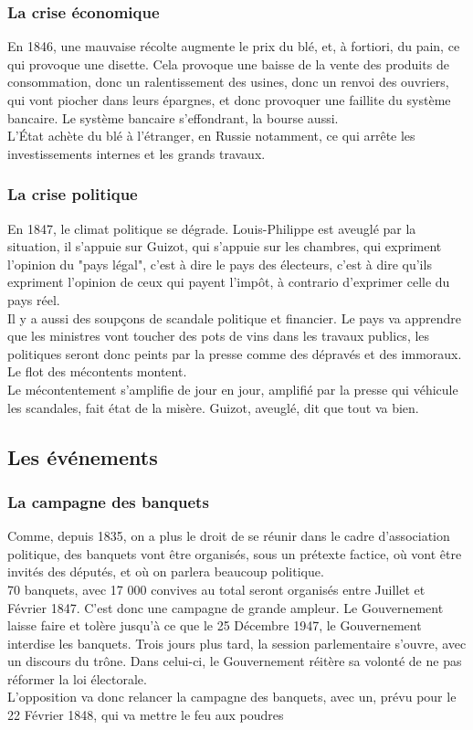 \documentclass[10pt, a4paper, openany]{book}
\begin{document}
\subsubsection{La crise économique}

En 1846, une mauvaise récolte augmente le prix du blé, et, à fortiori, du pain, ce qui provoque une disette. Cela provoque une baisse de la vente des produits de consommation, donc un ralentissement des usines, donc un renvoi des ouvriers, qui vont piocher dans leurs épargnes, et donc provoquer une faillite du système bancaire. Le système bancaire s'effondrant, la bourse aussi. \\
L'État achète du blé à l'étranger, en Russie notamment, ce qui arrête les investissements internes et les grands travaux. 

\subsubsection{La crise politique}

En 1847, le climat politique se dégrade. Louis-Philippe est aveuglé par la situation, il s'appuie sur Guizot, qui s'appuie sur les chambres, qui expriment l'opinion du "pays légal", c'est à dire le pays des électeurs, c'est à dire qu'ils expriment l'opinion de ceux qui payent l'impôt, à contrario d'exprimer celle du pays réel. \\
Il y a aussi des soupçons de scandale politique et financier. Le pays va apprendre que les ministres vont toucher des pots de vins dans les travaux publics, les politiques seront donc peints par la presse comme des dépravés et des immoraux. Le flot des mécontents montent. \\
Le mécontentement s'amplifie de jour en jour, amplifié par la presse qui véhicule les scandales, fait état de la misère. Guizot, aveuglé, dit que tout va bien. 

\subsection{Les événements}

\subsubsection{La campagne des banquets}

Comme, depuis 1835, on a plus le droit de se réunir dans le cadre d'association politique, des banquets vont être organisés, sous un prétexte factice, où vont être invités des députés, et où on parlera beaucoup politique. \\
70 banquets, avec 17 000 convives au total seront organisés entre Juillet et Février 1847. C'est donc une campagne de grande ampleur. Le Gouvernement laisse faire et tolère jusqu'à ce que le 25 Décembre 1947, le Gouvernement interdise les banquets. Trois jours plus tard, la session parlementaire s'ouvre, avec un discours du trône. Dans celui-ci, le Gouvernement réitère sa volonté de ne pas réformer la loi électorale. \\
L'opposition va donc relancer la campagne des banquets, avec un, prévu pour le 22 Février 1848, qui va mettre le feu aux poudres
\end{document}
